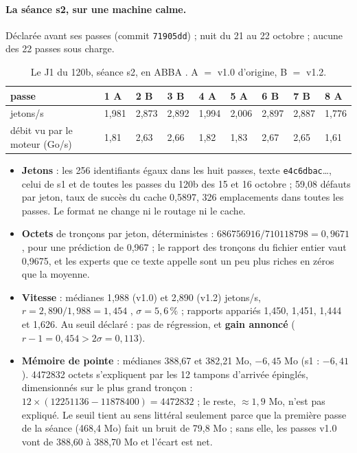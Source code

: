 \paragraph{La séance s2, sur une machine calme.} Déclarée avant ses passes (commit \texttt{71905dd}) ; nuit du 21 au 22 octobre ; aucune des 22 passes sous charge.

\begin{table}[ht]
\centering\small
\caption[Le J1 du 120b, séance s2]{Le J1 du 120b, séance s2, en ABBA \mes. A $=$ v1.0 d'origine, B $=$ v1.2.}
\label{t3cod:tab:j1}
\begin{tabular}{@{}lllllllll@{}}
\toprule
passe & 1 A & 2 B & 3 B & 4 A & 5 A & 6 B & 7 B & 8 A \\
\midrule
jetons/s & 1,981 & 2,873 & 2,892 & 1,994 & 2,006 & 2,897 & 2,887 & 1,776 \\
débit vu par le moteur (Go/s) & 1,81 & 2,63 & 2,66 & 1,82 & 1,83 & 2,67 & 2,65 & 1,61 \\
\bottomrule
\end{tabular}
\end{table}

\begin{figure}[tbp]
\centering
\GrapheCodonJalon
{}
\label{fig:t3-codon-jalon}
\end{figure}

\begin{itemize}
\item \textbf{Jetons} : les 256 identifiants égaux dans les huit passes, texte \texttt{e4c6dbac}\dots, celui de s1 et de toutes les passes du 120b des 15 et 16 octobre ; 59,08 défauts par jeton, taux de succès du cache 0,5897, 326 emplacements dans toutes les passes. Le format ne change ni le routage ni le cache.
\item \textbf{Octets} de tronçons par jeton, déterministes : $\num{686756916}/\num{710118798} = 0{,}9671$, pour une prédiction de 0,967 ; le rapport des tronçons du fichier entier vaut 0,9675, et les experts que ce texte appelle sont un peu plus riches en zéros que la moyenne.
\item \textbf{Vitesse} : médianes 1,988 (v1.0) et 2,890 (v1.2) jetons/s, $r = 2{,}890/1{,}988 = 1{,}454$ \calc, $\sigma = 5{,}6\,\%$ ; rapports appariés 1,450, 1,451, 1,444 et 1,626. Au seuil déclaré : pas de régression, et \textbf{gain annoncé} ($r - 1 = 0{,}454 > 2\sigma = 0{,}113$).
\item \textbf{Mémoire de pointe} : médianes 388,67 et 382,21 Mo, $-6{,}45$ Mo (s1 : $-6{,}41$). \num{4472832} octets s'expliquent par les 12 tampons d'arrivée épinglés, dimensionnés sur le plus grand tronçon : $12 \times (\num{12251136} - \num{11878400}) = \num{4472832}$ \calc ; le reste, $\approx 1{,}9$ Mo, n'est pas expliqué. Le seuil tient au sens littéral seulement parce que la première passe de la séance (468,4 Mo) fait un bruit de 79,8 Mo ; sans elle, les passes v1.0 vont de 388,60 à 388,70 Mo et l'écart est net.
\end{itemize}

